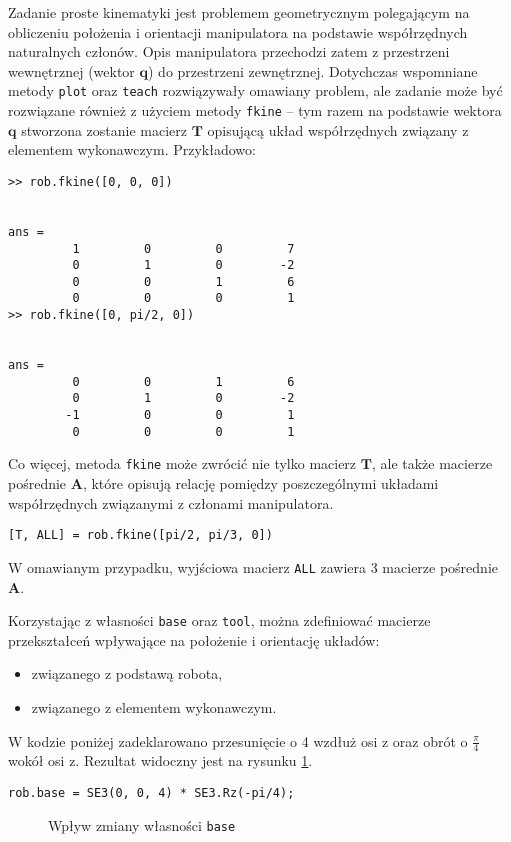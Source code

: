 \documentclass[11pt, a4paper]{article}
\newcommand{\matrixT}{$\mathbf{T}$}
\newcommand{\matrixA}{$\mathbf{A}$}
\begin{document}
Zadanie proste kinematyki jest problemem geometrycznym polegającym na obliczeniu położenia i orientacji manipulatora na podstawie współrzędnych naturalnych członów. Opis manipulatora przechodzi zatem z przestrzeni wewnętrznej (wektor $\mathbf{q}$) do przestrzeni zewnętrznej. Dotychczas wspomniane metody \texttt{plot} oraz \texttt{teach} rozwiązywały omawiany problem, ale zadanie może być rozwiązane również z użyciem metody \texttt{fkine} --  tym razem na podstawie wektora $\mathbf{q}$ stworzona zostanie macierz \matrixT{} opisującą układ współrzędnych związany z elementem wykonawczym. Przykładowo:
\begin{lstlisting}[numbers = none]
>> rob.fkine([0, 0, 0])
 

ans = 
         1         0         0         7
         0         1         0        -2
         0         0         1         6
         0         0         0         1
>> rob.fkine([0, pi/2, 0])
 

ans = 
         0         0         1         6
         0         1         0        -2
        -1         0         0         1
         0         0         0         1
\end{lstlisting}

Co więcej, metoda \texttt{fkine} może zwrócić nie tylko macierz \matrixT, ale także macierze pośrednie \matrixA, które opisują relację pomiędzy poszczególnymi układami współrzędnych związanymi z członami manipulatora.
\begin{lstlisting}
[T, ALL] = rob.fkine([pi/2, pi/3, 0])
\end{lstlisting}

W omawianym przypadku, wyjściowa macierz \texttt{ALL} zawiera 3 macierze pośrednie \matrixA.

Korzystając z własności \texttt{base} oraz \texttt{tool}, można zdefiniować macierze przekształceń wpływające na położenie i orientację układów: 
\begin{itemize}
    \item związanego z podstawą robota,
    \item związanego z elementem wykonawczym.
\end{itemize}
W kodzie poniżej zadeklarowano przesunięcie o 4 wzdłuż osi z oraz obrót o $\frac{\pi}{4}$ wokół osi z.
Rezultat widoczny jest na rysunku \ref{fig:base}.
\begin{lstlisting}
rob.base = SE3(0, 0, 4) * SE3.Rz(-pi/4);
\end{lstlisting}

\begin{figure}[htbp!]
	\centering
	
	\hfill%
	
	\caption{Wpływ zmiany własności \texttt{base} \label{fig:base}}
\end{figure}
\end{document}
